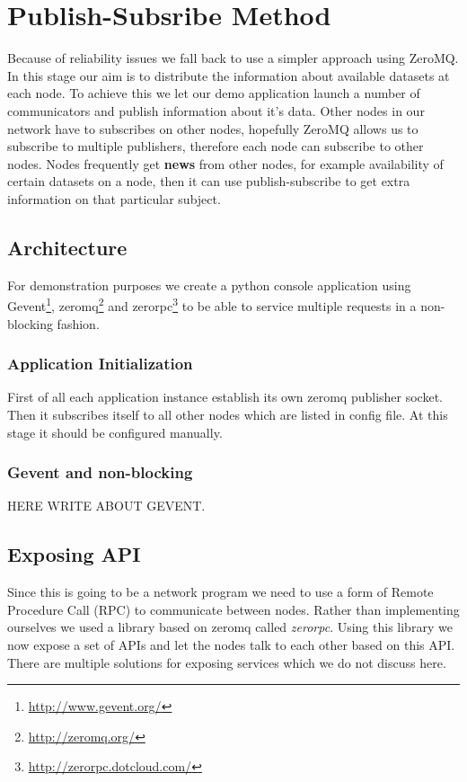 \section{Publish-Subsribe Method}
Because of reliability issues we fall back to use a simpler approach using ZeroMQ. In this stage our aim is to distribute the information about available datasets at each node. To achieve this we let our demo application launch a number of communicators and publish information about it's data. Other nodes in our network have to subscribes on other nodes, hopefully ZeroMQ allows us to subscribe to multiple publishers, therefore each node can subscribe to other nodes. Nodes frequently get \textbf{news} from other nodes, for example availability of certain datasets on a node, then it can use publish-subscribe to get extra information on that particular subject.

\subsection{Architecture}
For demonstration purposes we create a python console application using Gevent\footnote{\url{http://www.gevent.org/}}, zeromq\footnote{\url{http://zeromq.org/}} and zerorpc\footnote{\url{http://zerorpc.dotcloud.com/}} to be able to service multiple requests in a non-blocking fashion.

\subsubsection{Application Initialization}
First of all each application instance establish its own zeromq publisher socket. Then it subscribes itself to all other nodes which are listed in config file. At this stage it should be configured manually.

\subsubsection{Gevent and non-blocking}
HERE WRITE ABOUT GEVENT.

\subsection{Exposing API}
Since this is going to be a network program we need to use a form of Remote Procedure Call (RPC) to communicate between nodes. Rather than implementing ourselves we used a library based on zeromq called \textit{zerorpc}. Using this library we now expose a set of APIs and let the nodes talk to each other based on this API. There are multiple solutions for exposing services which we do not discuss here.

